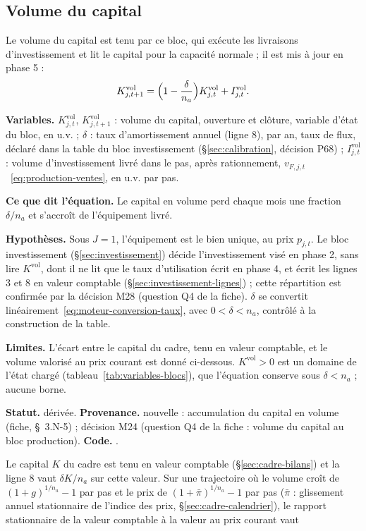 \documentclass[11pt,a4paper]{article}
\newcommand{\variables}{\par\noindent\textbf{Variables.} }
\newcommand{\sens}{\par\noindent\textbf{Ce que dit l'équation.} }
\newcommand{\hyp}{\par\noindent\textbf{Hypothèses.} }
\newcommand{\limites}{\par\noindent\textbf{Limites.} }
\newcommand{\code}[1]{\texttt{\detokenize{#1}}}
\newcommand{\tracabilite}[3]{\par\smallskip\noindent\textbf{Statut.} #1. \textbf{Provenance.} #2. \textbf{Code.} \code{#3}.}
\begin{document}
\subsection{Volume du capital}
\label{sec:production-capital}
Le volume du capital est tenu par ce bloc, qui exécute les livraisons d'investissement et lit le capital pour la capacité normale ; il est mis à jour en phase 5 :
\begin{equation}\label{eq:production-capital-volume}
K^{\mathrm{vol}}_{j,t+1} = \Bigl(1 - \frac{\delta}{n_a}\Bigr) K^{\mathrm{vol}}_{j,t} + I^{\mathrm{vol}}_{j,t} .
\end{equation}
\begin{lecture}
\variables $K^{\mathrm{vol}}_{j,t}$, $K^{\mathrm{vol}}_{j,t+1}$ : volume du capital, ouverture et clôture, variable d'état du bloc, en u.v. ; $\delta$ : taux d'amortissement annuel (ligne 8), par an, taux de flux, déclaré dans la table du bloc investissement (\S\ref{sec:calibration}, décision P68) ; $I^{\mathrm{vol}}_{j,t}$ : volume d'investissement livré dans le pas, après rationnement, $v_{F,j,t}$~\eqref{eq:production-ventes}, en u.v. par pas.
\sens Le capital en volume perd chaque mois une fraction $\delta/n_a$ et s'accroît de l'équipement livré.
\hyp Sous $J = 1$, l'équipement est le bien unique, au prix $p_{j,t}$. Le bloc investissement (\S\ref{sec:investissement}) décide l'investissement visé en phase 2, sans lire $K^{\mathrm{vol}}$, dont il ne lit que le taux d'utilisation écrit en phase 4, et écrit les lignes 3 et 8 en valeur comptable (\S\ref{sec:investissement-lignes}) ; cette répartition est confirmée par la décision M28 (question Q4 de la fiche). $\delta$ se convertit linéairement~\eqref{eq:moteur-conversion-taux}, avec $0 < \delta < n_a$, contrôlé à la construction de la table.
\limites L'écart entre le capital du cadre, tenu en valeur comptable, et le volume valorisé au prix courant est donné ci-dessous. $K^{\mathrm{vol}} > 0$ est un domaine de l'état chargé (tableau~\ref{tab:variables-blocs}), que l'équation conserve sous $\delta < n_a$ ; aucune borne.
\tracabilite{dérivée}{nouvelle : accumulation du capital en volume (fiche, \S~3.N-5) ; décision M24 (question Q4 de la fiche : volume du capital au bloc production)}{nations.blocs.production.capital_en_volume}
\end{lecture}
Le capital $K$ du cadre est tenu en valeur comptable (\S\ref{sec:cadre-bilans}) et la ligne 8 vaut $\delta K/n_a$ sur cette valeur. Sur une trajectoire où le volume croît de $(1 + g)^{1/n_a} - 1$ par pas et le prix de $(1 + \bar\pi)^{1/n_a} - 1$ par pas ($\bar\pi$ : glissement annuel stationnaire de l'indice des prix, \S\ref{sec:cadre-calendrier}), le rapport stationnaire de la valeur comptable à la valeur au prix courant vaut
\end{document}
